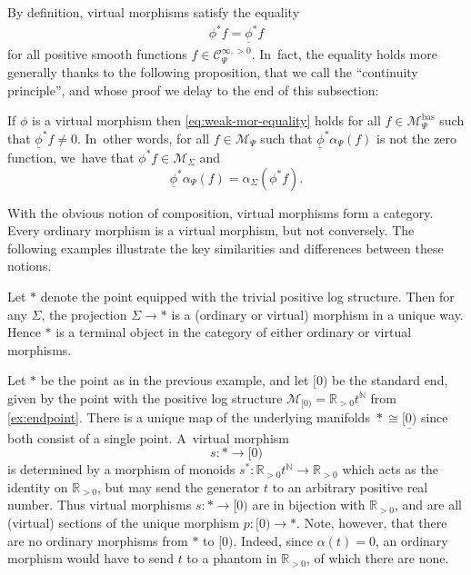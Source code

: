 \documentclass[JEP,XML,SOM,Unicode,NoFloatCountersInSection,published]{cedram}
\theoremstyle{definition}
\theoremstyle{remark}
\newenvironment{example}
  {\pushQED{\qed}\renewcommand{\qedsymbol}{$\lozenge$}\examplex}
  {\popQED\endexamplex}
\newcommand{\RR}{\mathbb{R}}
\newcommand{\NN}{\mathbb{N}}
\newcommand{\cM}{\mathscr{M}}
\newcommand{\cMbas}{\mathscr{M}^{\mathrm{bas}}}
\newcommand{\Cinfpos}[1]{\mathscr{C}^{\infty, > 0}_{#1}}
\newcommand{\Sig}{\Sigma}
\newcommand{\uphi}{\underline{\phi}}
\begin{document}
By definition, virtual morphisms satisfy the equality
\begin{align}
\phi^*f = \uphi^*f \label{eq:weak-mor-equality}
\end{align}
for all positive smooth functions $f \in \Cinfpos{\Psi}$. In~fact, the equality holds more generally thanks to the following proposition, that we call the ``continuity principle'', and whose proof we delay to the end of this subsection:

\begin{proposition}\label{prop:weak-mor-basic-sections}
If $\phi$ is a virtual morphism then \eqref{eq:weak-mor-equality} holds for all $f \in \cMbas_{\Psi}$ such that $\uphi^*f \neq 0$. In~other words, for all $f\in\cM_\Psi$ such that $\uphi^*\alpha_\Psi(f)$ is not the zero function, we~have that $\phi^*f\in \cM_\Sig$ and
\[
\uphi^*\alpha_\Psi(f) = \alpha_\Sig(\phi^*f).
\]
\end{proposition}

With the obvious notion of composition, virtual morphisms form a category. Every ordinary morphism is a virtual morphism, but not conversely. The following examples illustrate the key similarities and differences between these notions.

\begin{example}
Let $*$ denote the point equipped with the trivial positive log structure. Then for any $\Sig$, the projection $\Sig \to *$ is a (ordinary or virtual) morphism in a unique way. Hence $*$ is a terminal object in the category of either ordinary or virtual morphisms.
\end{example}

\begin{example}\label{ex:weak-mor-pt-to-end}
Let $*$ be the point as in the previous example, and let $[0)$ be the standard end, given by the point with the positive log structure $\cM_{[0)} = \RR_{>0}t^\NN$ from \autoref{ex:endpoint}. There is a unique map of the underlying manifolds $\underline{*}\cong\underline{[0)}$ since both consist of a single point. A~virtual morphism
\[
s\colon * \to [0)
\]
is determined by a morphism of monoids $s^*\colon\RR_{>0}t^\NN \to \RR_{>0}$ which acts as the identity on $\RR_{>0}$, but may send the generator $t$ to an arbitrary positive real number. Thus virtual morphisms $s\colon * \to [0)$ are in bijection with $\RR_{>0}$, and are all (virtual) sections of the unique morphism $p\colon [0)\to *$. Note, however, that there are no ordinary morphisms from $*$ to $[0)$. Indeed, since $\alpha(t)=0$, an ordinary morphism would have to send $t$ to a phantom in $\RR_{>0}$, of which there are none.
\end{example}
\end{document}
